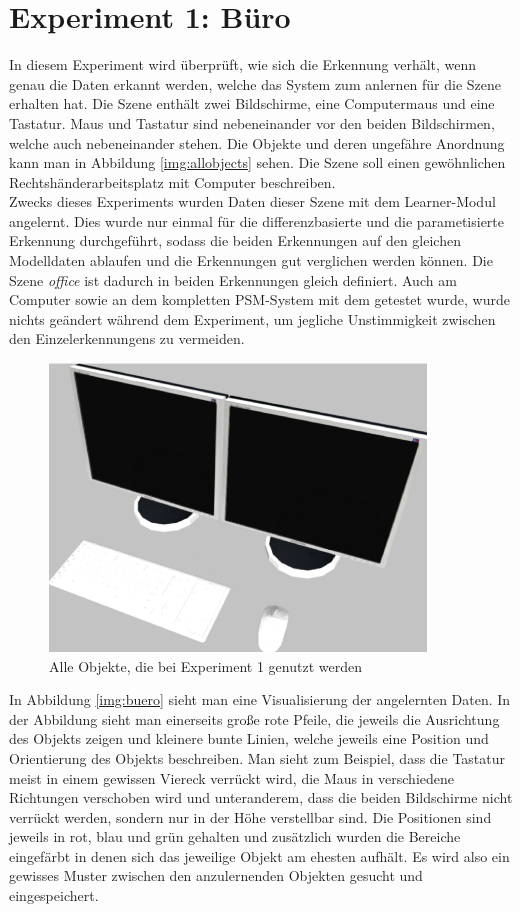 \section{Experiment 1: Büro}\label{sec:ex1}
In diesem Experiment wird überprüft, wie sich die Erkennung verhält, wenn genau die Daten erkannt werden, welche das System zum anlernen für die Szene erhalten hat. Die Szene enthält zwei Bildschirme, eine Computermaus und eine Tastatur. Maus und Tastatur sind nebeneinander vor den beiden Bildschirmen, welche auch nebeneinander stehen. Die Objekte und deren ungefähre Anordnung kann man in Abbildung \ref{img:allobjects} sehen. Die Szene soll einen gewöhnlichen Rechtshänderarbeitsplatz mit Computer beschreiben.\smallskip\\
Zwecks dieses Experiments wurden Daten dieser Szene mit dem Learner-Modul angelernt. Dies wurde nur einmal für die differenzbasierte und die parametisierte Erkennung durchgeführt, sodass die beiden Erkennungen auf den gleichen Modelldaten ablaufen und die Erkennungen gut verglichen werden können. Die Szene \textit{office} ist dadurch in beiden Erkennungen gleich definiert. Auch am Computer sowie an dem kompletten PSM-System mit dem getestet wurde, wurde nichts geändert während dem Experiment, um jegliche Unstimmigkeit zwischen den Einzelerkennungens zu vermeiden.\smallskip\\
\begin{figure}
	\centering
	\includegraphics[width=10cm]{bilder/allobjectsbuero.pdf}
	\caption{Alle Objekte, die bei Experiment 1 genutzt werden \cite{gassner17}}
	\label{img:allobjectsbuero}
\end{figure}
 In Abbildung \ref{img:buero} sieht man eine Visualisierung der angelernten Daten. In der Abbildung sieht man einerseits große rote Pfeile, die jeweils die Ausrichtung des Objekts zeigen und kleinere bunte Linien, welche jeweils eine Position und Orientierung des Objekts beschreiben. Man sieht zum Beispiel, dass die Tastatur meist in einem gewissen Viereck verrückt wird, die Maus in verschiedene Richtungen verschoben wird und unteranderem, dass die beiden Bildschirme nicht verrückt werden, sondern nur in der Höhe verstellbar sind. Die Positionen sind jeweils in rot, blau und grün gehalten und zusätzlich wurden die Bereiche eingefärbt in denen sich das jeweilige Objekt am ehesten aufhält. Es wird also ein gewisses Muster zwischen den anzulernenden Objekten gesucht und eingespeichert.\smallskip\\
